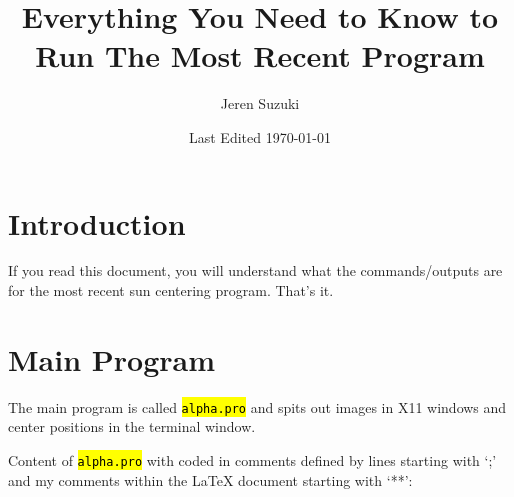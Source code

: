 \documentclass[10pt]{scrartcl}
\title{Everything You Need to Know to Run The Most Recent Program}
\author{Jeren Suzuki}
\date{Last Edited \today}
\newcommand{\code}[1]{\hl{\texttt{#1}}}
\begin{document}
\maketitle
\tableofcontents
{}
\clearpage
{}

\section*{Introduction}
\label{sec:introduction}
If you read this document, you will understand what the commands/outputs are for the most recent sun centering program. That's it.

\section{Main Program} %
\label{sec:main_program}
The main program is called \code{alpha.pro} and spits out images in X11 windows and center positions in the terminal window. 


Content of \code{alpha.pro} with coded in comments defined by lines starting with `;' and my comments within the \LaTeX{} document starting with `**':
\end{document}
